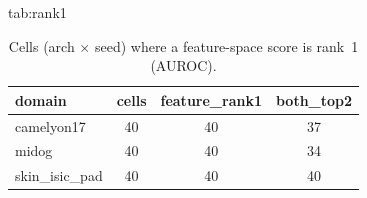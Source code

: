 \begin{table}[t]
\floatconts
  {tab:rank1}
  {\caption{Cells (arch $\times$ seed) where a feature-space score is rank~1 (AUROC).}}
  {\small
  \begin{tabular}{@{}lccc@{}}
  \toprule
  domain & cells & feature\_rank1 & both\_top2 \\
  \midrule
  camelyon17 & 40 & 40 & 37 \\
  midog & 40 & 40 & 34 \\
  skin\_isic\_pad & 40 & 40 & 40 \\
  \bottomrule
  \end{tabular}}
\end{table}
